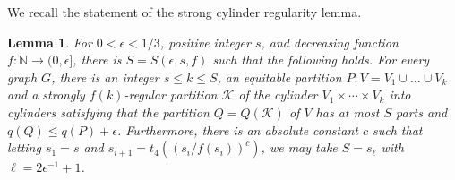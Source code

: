 \documentclass[11pt]{article}
\newtheorem{lemma}{Lemma}[section]
\begin{document}
We recall the statement of the strong cylinder regularity lemma.
\begin{lemma} \label{scr2}
For $0<\epsilon<1/3$, positive integer $s$, and decreasing function $f:\mathbb{N} \rightarrow
(0,\epsilon]$, there is $S=S(\epsilon,s,f)$ such that the following holds. For every
graph $G$, there is an integer $s \leq k \leq S$, an equitable  partition $P:V=V_1 \cup
\ldots \cup V_k$ and a strongly $f(k)$-regular partition $\mathcal{K}$ of the
cylinder $V_1 \times \cdots \times V_k$ into cylinders satisfying that the
partition $Q=Q(\mathcal{K})$ of $V$ has at most $S$ parts and $q(Q) \leq
q(P)+\epsilon$. Furthermore, there is an absolute constant $c$ such that
letting $s_1=s$ and $s_{i+1}=t_4\left(\left(s_i/f(s_i)\right)^c\right)$, we may
take $S=s_{\ell}$ with $\ell=2\epsilon^{-1}+1$.
\end{lemma}
\end{document}
